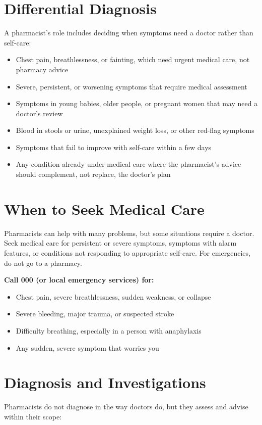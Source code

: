 \section*{Differential Diagnosis}
A pharmacist's role includes deciding when symptoms need a doctor rather than self-care:

\begin{itemize}
    \item Chest pain, breathlessness, or fainting, which need urgent medical care, not pharmacy advice
    \item Severe, persistent, or worsening symptoms that require medical assessment
    \item Symptoms in young babies, older people, or pregnant women that may need a doctor's review
    \item Blood in stools or urine, unexplained weight loss, or other red-flag symptoms
    \item Symptoms that fail to improve with self-care within a few days
    \item Any condition already under medical care where the pharmacist's advice should complement, not replace, the doctor's plan
\end{itemize}

\section*{When to Seek Medical Care}
Pharmacists can help with many problems, but some situations require a doctor. Seek medical care for persistent or severe symptoms, symptoms with alarm features, or conditions not responding to appropriate self-care. For emergencies, do not go to a pharmacy.

\textbf{Call 000 (or local emergency services) for:}
\begin{itemize}
    \item Chest pain, severe breathlessness, sudden weakness, or collapse
    \item Severe bleeding, major trauma, or suspected stroke
    \item Difficulty breathing, especially in a person with anaphylaxis
    \item Any sudden, severe symptom that worries you
\end{itemize}

\section*{Diagnosis and Investigations}
Pharmacists do not diagnose in the way doctors do, but they assess and advise within their scope:


